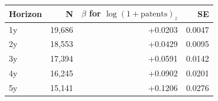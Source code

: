 \begin{tabular}{lrrr}
\toprule
Horizon & N & $\beta$ for $\log(1+\text{patents})_z$ & SE \\
\midrule
1y & 19,686 & +0.0203 & 0.0047 \\
2y & 18,553 & +0.0429 & 0.0095 \\
3y & 17,394 & +0.0591 & 0.0142 \\
4y & 16,245 & +0.0902 & 0.0201 \\
5y & 15,141 & +0.1206 & 0.0276 \\
\bottomrule
\end{tabular}
